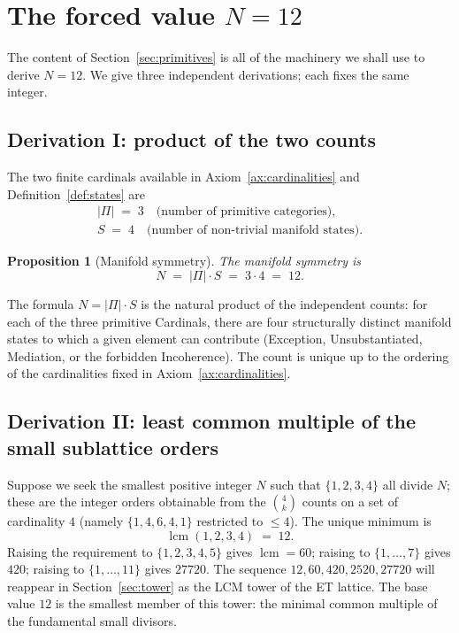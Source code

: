 \documentclass[11pt,a4paper]{article}
\newtheorem{proposition}[theorem]{Proposition}
\theoremstyle{definition}
\theoremstyle{remark}
\DeclareMathOperator{\lcm}{lcm}
\begin{document}
\section{The forced value \texorpdfstring{$N=12$}{N=12}}\label{sec:N12}

The content of Section~\ref{sec:primitives} is all of the machinery we shall use to derive $N=12$. We give three independent derivations; each fixes the same integer.

\subsection{Derivation I: product of the two counts}

The two finite cardinals available in Axiom~\ref{ax:cardinalities} and Definition~\ref{def:states} are
\[
\begin{gathered}
|\Pi| \;=\; 3 \quad\text{(number of primitive categories)},\\
S \;=\; 4 \quad\text{(number of non-trivial manifold states)}.
\end{gathered}
\]

\begin{proposition}[Manifold symmetry]\label{prop:N12}
The \emph{manifold symmetry} is
\[
N \;=\; |\Pi|\cdot S \;=\; 3\cdot 4 \;=\; 12.
\]
\end{proposition}

The formula $N = |\Pi|\cdot S$ is the natural product of the independent counts: for each of the three primitive Cardinals, there are four structurally distinct manifold states to which a given element can contribute (Exception, Unsubstantiated, Mediation, or the forbidden Incoherence). The count is unique up to the ordering of the cardinalities fixed in Axiom~\ref{ax:cardinalities}.

\subsection{Derivation II: least common multiple of the small sublattice orders}

Suppose we seek the smallest positive integer $N$ such that $\{1,2,3,4\}$ all divide $N$; these are the integer orders obtainable from the $\binom{4}{k}$ counts on a set of cardinality $4$ (namely $\{1,4,6,4,1\}$ restricted to $\le 4$). The unique minimum is
\[
\lcm(1,2,3,4) \;=\; 12.
\]
Raising the requirement to $\{1,2,3,4,5\}$ gives $\lcm=60$; raising to $\{1,\ldots,7\}$ gives $420$; raising to $\{1,\ldots,11\}$ gives $27720$. The sequence $12,60,420,2520,27720$ will reappear in Section~\ref{sec:tower} as the LCM tower of the ET lattice. The base value $12$ is the smallest member of this tower: the minimal common multiple of the fundamental small divisors.
\end{document}
